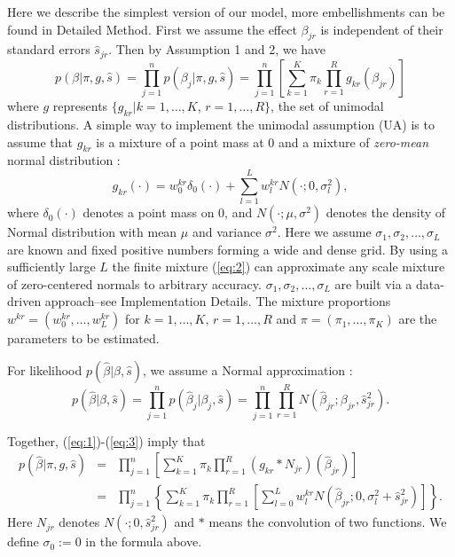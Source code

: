 \documentclass[12pt]{article}
\begin{document}
\vspace{4mm}\noindent Here we describe the simplest version of our model, more embellishments can be found in Detailed Method. First we assume the effect $\beta_{jr}$ is independent of their standard errors $\hat s_{jr}$. Then by Assumption 1 and 2, we have
\begin{equation}
p(\beta|\pi,g,\hat s) = \prod_{j=1}^np(\beta_j|\pi,g,\hat s) = \prod_{j=1}^n \left [\sum_{k=1}^K\pi_k\prod_{r=1}^R  g_{kr}(\beta_{jr})\right ]
\label{eq:1}
\end{equation}
where $g$ represents $\{g_{kr}|k = 1,\ldots,K$, $r=1,\ldots,R\}$, the set of unimodal distributions. A simple way to implement the unimodal assumption (UA) is to assume that $g_{kr}$ is a mixture of a point mass at 0 and a mixture of {\it zero-mean} normal distribution \cite{Stephens2017}:
\begin{equation}
g_{kr}(\cdot) =  w_0^{kr}\delta_0(\cdot)+\sum_{l=1}^L w_l^{kr}N(\cdot;0,\sigma_l^2),
\label{eq:2}
\end{equation}
where $\delta_0(\cdot)$ denotes a point mass on 0, and $N(\cdot;\mu,\sigma^2)$ denotes the density of Normal distribution with mean $\mu$ and variance $\sigma^2$. Here we assume  $\sigma_1,\sigma_2,\ldots,\sigma_L$ are known and fixed positive numbers forming a wide and dense grid. By using a sufficiently large $L$ the finite mixture (\ref{eq:2}) can approximate any scale mixture of zero-centered normals to arbitrary accuracy. $\sigma_1,\sigma_2,\ldots,\sigma_L$ are built via a data-driven approach--see Implementation Details. The mixture proportions $w^{kr}=(w^{kr}_0,\ldots,w^{kr}_L)$ for $k=1,\ldots,K$, $r=1,\ldots,R$ and $\pi=(\pi_1,\ldots,\pi_K)$ are the parameters to be estimated. 

\vspace{4mm}\noindent For likelihood $p(\hat \beta|\beta,\hat s)$, we assume a Normal approximation \cite{Wakefield2009}:
\begin{equation}
p(\hat \beta|\beta,\hat s) = \prod_{j=1}^np(\hat \beta_j|\beta_j,\hat s) = \prod_{j=1}^n\prod_{r=1}^RN(\hat\beta_{jr};\beta_{jr},\hat s_{jr}^2).
\label{eq:3}
\end{equation}

\vspace{4mm}\noindent Together, (\ref{eq:1})-(\ref{eq:3}) imply that 
\begin{eqnarray}
p(\hat\beta|\pi,g,\hat s) &=& \prod_{j=1}^n\left[\sum_{k=1}^K\pi_k\prod_{r=1}^R(g_{kr}*N_{jr})(\hat\beta_{jr})\right] \nonumber \\ 
&=& \prod_{j=1}^n\left\{\sum_{k=1}^K\pi_k\prod_{r=1}^R\left[ \sum_{l=0}^Lw_l^{kr}N(\hat\beta_{jr};0,\sigma_l^2+\hat s_{jr}^2)\right]\right\}.
\label{eq:4}
\end{eqnarray}
Here $N_{jr}$ denotes $N(\cdot;0,\hat s_{jr}^2)$ and $*$ means the convolution of two functions. We define $\sigma_0:=0$ in the formula above.
\end{document}
